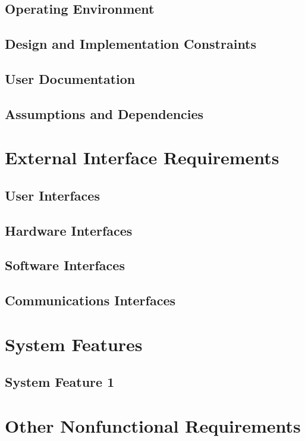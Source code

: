        \section{Operating Environment}
        \section{Design and Implementation Constraints}
        \section{User Documentation}
        \section{Assumptions and Dependencies}
    
    \newpage
    \chapter{External Interface Requirements}\label{External Interface Requirements}
        \section{User Interfaces}
        \section{Hardware Interfaces}
        \section{Software Interfaces}
        \section{Communications Interfaces}
    
    \newpage
    \chapter{System Features}\label{System Features}
        \section{System Feature 1}
    
    
    \chapter{Other Nonfunctional Requirements}\label{Other Nonfunctional Requirements}
